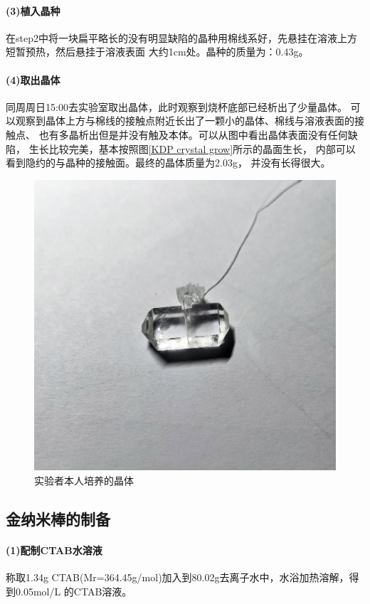 \documentclass[a4paper,zihao=5,UTF8]{ctexart}
\begin{document}
    \paragraph{(3)植入晶种}
    在step2中将一块扁平略长的没有明显缺陷的晶种用棉线系好，先悬挂在溶液上方短暂预热，然后悬挂于溶液表面
    大约1cm处。晶种的质量为：0.43g。
    \paragraph{(4)取出晶体}
    同周周日15:00去实验室取出晶体，此时观察到烧杯底部已经析出了少量晶体。
    可以观察到晶体上方与棉线的接触点附近长出了一颗小的晶体、棉线与溶液表面的接触点、
    也有多晶析出但是并没有触及本体。可以从图中看出晶体表面没有任何缺陷，
    生长比较完美，基本按照图\ref{KDP crystal grow}所示的晶面生长，
    内部可以看到隐约的与晶种的接触面。最终的晶体质量为2.03g，
    并没有长得很大。
    \begin{figure}[htbp]
        \centering 
        \includegraphics[scale=0.11]{mycrystal.jpg}
        \caption{实验者本人培养的晶体}
        \label{my crystal}
    \end{figure}
    \subsection{金纳米棒的制备}
    \paragraph{(1)配制CTAB水溶液}
    称取1.34g CTAB(Mr=364.45g/mol)加入到80.02g去离子水中，水浴加热溶解，得到0.05mol/L
    的CTAB溶液。
\end{document}
